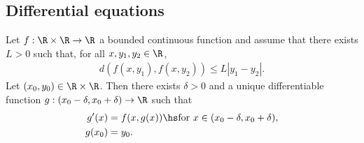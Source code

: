 \documentclass{article}
\begin{document}
\subsection{Differential equations}

\begin{theorem}[Picard]
	Let $f:\R\times\R\to\R$ a bounded continuous function and assume that there
	exists $L>0$ such that, for all $x,y_1,y_2\in\R$,
	\begin{align*}
		d(f(x,y_1),f(x,y_2)) \leq L|y_1-y_2|.
	\end{align*}
	Let $(x_0,y_0)\in\R\times\R$. Then there exists $\delta>0$ and a
	unique differentiable function $g:(x_0-\delta,x_0+\delta)\to\R$
	such that
	\begin{align*}
		g'(x)  & = f(x,g(x))\hs\text{for }x\in(x_0-\delta,x_0+\delta), \\
		g(x_0) & = y_0.
	\end{align*}
\end{theorem}
\end{document}
